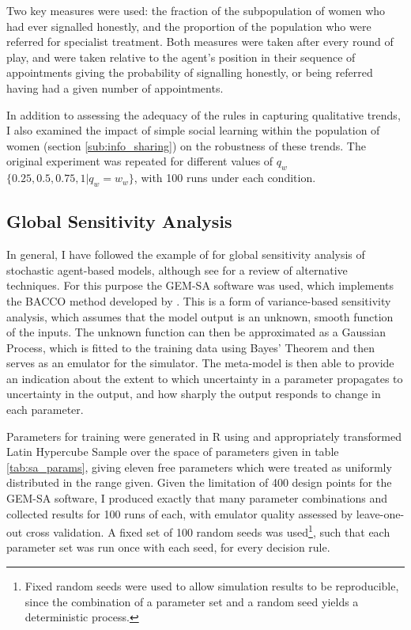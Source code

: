 Two key measures were used: the fraction of the subpopulation of women who had ever signalled honestly, and the proportion of the population who were referred for specialist treatment. Both measures were taken after every round of play, and were taken relative to the agent's position in their sequence of appointments giving the probability of signalling honestly, or being referred having had a given number of appointments.


In addition to assessing the adequacy of the rules in capturing qualitative trends, I also examined the impact of simple social learning within the population of women (section \ref{sub:info_sharing}) on the robustness of these trends. The original experiment was repeated for different values of $q_{w}$ \(\{0.25, 0.5, 0.75, 1 | q_{w}=w_{w}\}\), with 100 runs under each condition. 

\subsection{Global Sensitivity Analysis}
\label{sub:sensitivity}

In general, I have followed the example of \cite{Bijak2013b} for global sensitivity analysis of stochastic agent-based models, although see \citet{Thiele2014} for a review of alternative techniques. For this purpose the \ac{GEM-SA} software \citep{Kennedy} was used, which implements the \ac{BACCO} method developed by \citeauthor{Oakley2004} \citeyear{Oakley2002,Oakley2004}. This is a form of variance-based sensitivity analysis, which assumes that the model output is an unknown, smooth function of the inputs. The unknown function can then be approximated as a Gaussian Process, which is fitted to the training data using Bayes' Theorem and then serves as an emulator for the simulator. The meta-model is then able to provide an indication about the extent to which uncertainty in a parameter propagates to uncertainty in the output, and how sharply the output responds to change in each parameter.

\begin{comment}

Justification for doing SA, point out the wide variety of places this gets used. Talk about uncertainty, briefly raise model discrepancy.

\end{comment}

Parameters for training were generated in R \citep{RTeam2014} using and appropriately transformed Latin Hypercube Sample \citep{Carnell2012} over the space of parameters given in table \ref{tab:sa_params}, giving eleven free parameters which were treated as uniformly distributed in the range given.  Given the limitation of 400 design points for the \ac{GEM-SA} software, I produced exactly that many parameter combinations and collected results for 100 runs of each, with emulator quality assessed by leave-one-out cross validation. A fixed set of 100 random seeds was used\footnote{Fixed random seeds were used to allow simulation results to be reproducible, since the combination of a parameter set and a random seed yields a deterministic process.}, such that each parameter set was run once with each seed, for every decision rule.

